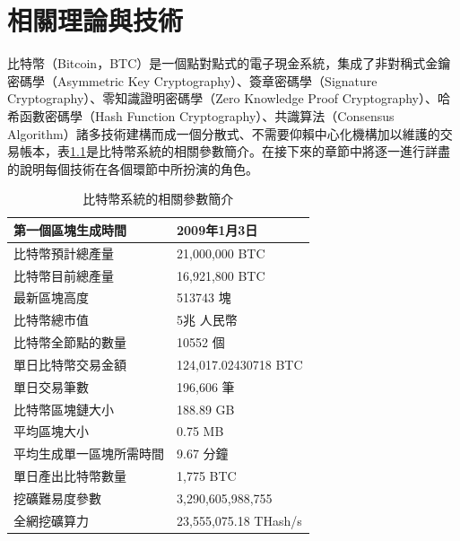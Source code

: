 
\chapter{相關理論與技術}
	
		⽐特幣（Bitcoin，BTC）是⼀個點對點式的電⼦現⾦系統，集成了非對稱式金鑰密碼學（Asymmetric Key Cryptography）\supercite{AsymmetricKeyCryptography}、簽章密碼學（Signature Cryptography）\supercite{Apublickeycryptosystemandasignatureschemebasedondiscretelogarithms}、零知識證明密碼學（Zero Knowledge Proof Cryptography）\supercite{Zero-KnowledgeProofsofIdentity}、哈希函數密碼學（Hash Function Cryptography）、共識算法（Consensus Algorithm）\supercite{Anonymousbyzantineconsensusfrommoderately-hardpuzzles:Amodelforbitcoin}諸多技術建構而成一個分散式、不需要仰賴中心化機構加以維護的交易帳本，表\ref{IntroductiontoBitcoin}是比特幣系統的相關參數簡介。在接下來的章節中將逐一進行詳盡的說明每個技術在各個環節中所扮演的角色。

		\begin{table}[!htbp]
		\centering
		\caption{比特幣系統的相關參數簡介}
		\label{IntroductiontoBitcoin}
		\begin{tabular}{|l|l|}
		\hline
		第一個區塊生成時間 & 2009年1月3日 \\ \hline
		比特幣預計總產量 & 21,000,000 BTC \\ \hline
		比特幣目前總產量 & 16,921,800 BTC \\ \hline
		最新區塊高度 & 513743 塊 \\ \hline
		比特幣總市值 & 5兆 人民幣 \\ \hline
		比特幣全節點的數量 & 10552 個 \\ \hline
		單日比特幣交易金額 & 124,017.02430718 BTC \\ \hline
		單日交易筆數 & 196,606 筆 \\ \hline
		比特幣區塊鏈大小 & 188.89 GB \\ \hline
		平均區塊大小 & 0.75 MB \\ \hline
		平均生成單一區塊所需時間 & 9.67 分鐘 \\ \hline
		單日產出比特幣數量 & 1,775 BTC \\ \hline
		挖礦難易度參數 & 3,290,605,988,755 \\ \hline
		全網挖礦算力 & 23,555,075.18 THash/s \\ \hline
		\end{tabular}
		\end{table}
		
